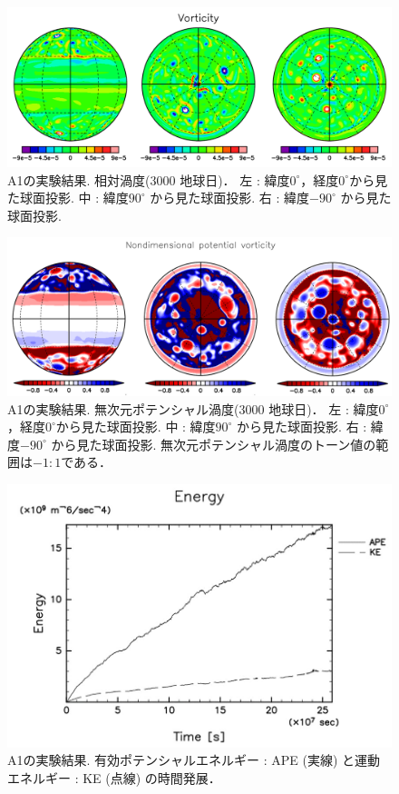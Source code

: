 \documentclass[a4j,12pt,openbib,oneside]{jreport}
\begin{document}
%
\begin{figure}[ht]
  \begin{center}
    \includegraphics[clip,width=12cm]{./fig/result/A1/A1_3.png}
    \caption{
      \footnotesize{A1の実験結果. 相対渦度(3000 地球日)．
左 : 緯度$0^\circ$，経度$0^\circ$から見た球面投影.
中 : 緯度$90^\circ$ から見た球面投影.
右 : 緯度$-90^\circ$ から見た球面投影.
      }
    }
    \label{fig:A1_3}
  \end{center}
\end{figure}
%
\begin{figure}[ht]
  \begin{center}
    \includegraphics[clip,width=12cm]{./fig/result/A1/A1_4.png}
    \caption{
      \footnotesize{A1の実験結果. 無次元ポテンシャル渦度(3000 地球日)．
左 : 緯度$0^\circ$，経度$0^\circ$から見た球面投影.
中 : 緯度$90^\circ$ から見た球面投影.
右 : 緯度$-90^\circ$ から見た球面投影.
無次元ポテンシャル渦度のトーン値の範囲は$-1:1$である．
      }
    }
    \label{fig:A1_4}
  \end{center}
\end{figure}
%
\begin{figure}[ht]
  \begin{center}
    \includegraphics[clip,width=12cm]{./fig/result/A1/A1_5.jpg}
    \caption{
      \footnotesize{A1の実験結果. 有効ポテンシャルエネルギー : APE (実線) と運動エネルギー : KE (点線) の時間発展．
      }
    }
    \label{fig:A1_5}
  \end{center}
\end{figure}
\end{document}
